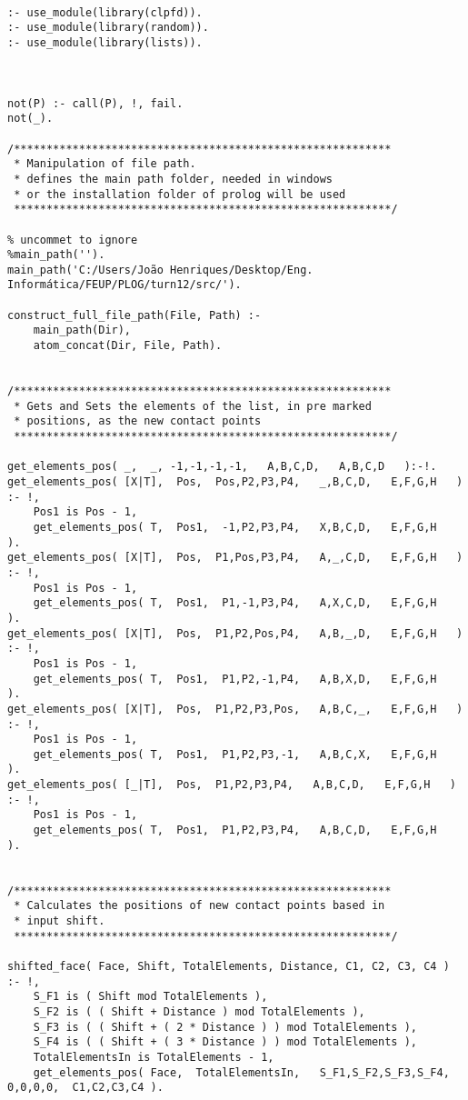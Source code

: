 \begin{lstlisting}

:- use_module(library(clpfd)).
:- use_module(library(random)).
:- use_module(library(lists)).



not(P) :- call(P), !, fail. 
not(_). 

/**********************************************************
 * Manipulation of file path.
 * defines the main path folder, needed in windows
 * or the installation folder of prolog will be used
 **********************************************************/
 
% uncommet to ignore
%main_path('').
main_path('C:/Users/João Henriques/Desktop/Eng. Informática/FEUP/PLOG/turn12/src/').

construct_full_file_path(File, Path) :-
	main_path(Dir),
	atom_concat(Dir, File, Path).
	
	
/**********************************************************
 * Gets and Sets the elements of the list, in pre marked
 * positions, as the new contact points
 **********************************************************/
 
get_elements_pos( _,  _, -1,-1,-1,-1,   A,B,C,D,   A,B,C,D   ):-!.
get_elements_pos( [X|T],  Pos,  Pos,P2,P3,P4,   _,B,C,D,   E,F,G,H   ) :- !,
	Pos1 is Pos - 1,
	get_elements_pos( T,  Pos1,  -1,P2,P3,P4,   X,B,C,D,   E,F,G,H   ).
get_elements_pos( [X|T],  Pos,  P1,Pos,P3,P4,   A,_,C,D,   E,F,G,H   ) :- !,
	Pos1 is Pos - 1,
	get_elements_pos( T,  Pos1,  P1,-1,P3,P4,   A,X,C,D,   E,F,G,H   ).
get_elements_pos( [X|T],  Pos,  P1,P2,Pos,P4,   A,B,_,D,   E,F,G,H   ) :- !,
	Pos1 is Pos - 1,
	get_elements_pos( T,  Pos1,  P1,P2,-1,P4,   A,B,X,D,   E,F,G,H   ).
get_elements_pos( [X|T],  Pos,  P1,P2,P3,Pos,   A,B,C,_,   E,F,G,H   ) :- !,
	Pos1 is Pos - 1,
	get_elements_pos( T,  Pos1,  P1,P2,P3,-1,   A,B,C,X,   E,F,G,H   ).
get_elements_pos( [_|T],  Pos,  P1,P2,P3,P4,   A,B,C,D,   E,F,G,H   ) :- !,
	Pos1 is Pos - 1,
	get_elements_pos( T,  Pos1,  P1,P2,P3,P4,   A,B,C,D,   E,F,G,H   ).

	
/**********************************************************
 * Calculates the positions of new contact points based in
 * input shift.
 **********************************************************/

shifted_face( Face, Shift, TotalElements, Distance, C1, C2, C3, C4 ) :- !,
	S_F1 is ( Shift mod TotalElements ),
	S_F2 is ( ( Shift + Distance ) mod TotalElements ),
	S_F3 is ( ( Shift + ( 2 * Distance ) ) mod TotalElements ),
	S_F4 is ( ( Shift + ( 3 * Distance ) ) mod TotalElements ),
	TotalElementsIn is TotalElements - 1,
	get_elements_pos( Face,  TotalElementsIn,   S_F1,S_F2,S_F3,S_F4,  0,0,0,0,  C1,C2,C3,C4 ).


\end{lstlisting}
